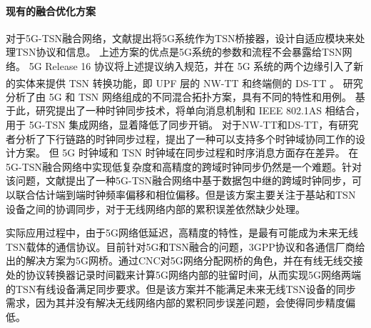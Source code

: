 \documentclass[UTF8,a4paper,12pt]{ctexart}
\numberwithin{equation}{section}
\begin{document}
\paragraph{现有的融合优化方案}
对于5G-TSN融合网络，文献\cite{nasrallah2018ultra}提出将5G系统作为TSN桥接器，设计自适应模块来处理TSN协议和信息。 上述方案的优点是5G系统的参数和流程不会暴露给TSN网络。 5G Release 16 协议将上述提议纳入规范，并在 5G 系统的两个边缘引入了新的实体来提供 TSN 转换功能，即 UPF 层的 NW-TT 和终端侧的 DS-TT \textsuperscript{\cite{wang2020leveraging}}。 研究\cite{neumann2018towards}分析了由 5G 和 TSN 网络组成的不同混合拓扑方案，具有不同的特性和用例。 基于此，研究\cite{chai2021cross}提出了一种时钟同步技术，将单向消息机制和 IEEE 802.1AS 相结合，用于 5G-TSN 集成网络，显着降低了同步开销。 对于NW-TT和DS-TT，有研究者\cite{lei20215g}分析了下行链路的时钟同步过程，提出了一种可以支持多个时钟域协同工作的设计方案。 但 5G 时钟域和 TSN 时钟域在同步过程和时序消息方面存在差异。 在5G-TSN融合网络中实现低复杂度和高精度的跨域时钟同步仍然是一个难题。针对该问题，文献\cite{schungel2022time}提出了一种5G-TSN融合网络中基于数据包中继的跨域时钟同步，可以联合估计端到端时钟频率偏移和相位偏移。但是该方案主要关注于基站和TSN设备之间的协调同步，对于无线网络内部的累积误差依然缺少处理。

实际应用过程中，由于5G网络低延迟，高精度的特性，是最有可能成为未来无线TSN载体的通信协议。目前针对5G和TSN融合的问题，3GPP协议和各通信厂商给出的解决方案为5G网桥。通过CNC对5G网络分配网桥的角色，并在有线无线交接处的协议转换器记录时间戳来计算5G网络内部的驻留时间，从而实现5G网络两端的TSN有线设备满足同步要求。但是该方案并不能满足未来无线TSN设备的同步需求，因为其并没有解决无线网络内部的累积同步误差问题，会使得同步精度偏低。
\end{document}

